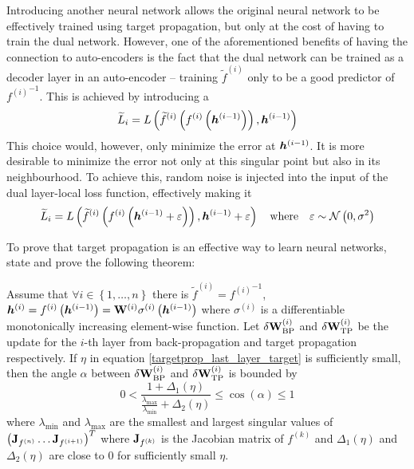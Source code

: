 Introducing another neural network allows the original neural network to be effectively trained using target propagation, but only at the cost of having to train the dual network. However, one of the aforementioned benefits of having the connection to auto-encoders is the fact that the dual network can be trained as a decoder layer in an auto-encoder -- training \( \widetilde{f}^{(i)} \) only to be a good predictor of \( {f^{(i)}}^{-1} \). This is achieved by introducing a 
\[ \widetilde{L}_i = L \left( \widetilde{f}^{(i)} \left( f^{(i)} \left( \bm{h}^{(i - 1)} \right) \right), \bm{h}^{(i - 1)} \right) \]
This choice would, however, only minimize the error at \( \bm{h}^{(i - 1)} \). It is more desirable to minimize the error not only at this singular point but also in its neighbourhood. To achieve this, random noise is injected into the input of the dual layer-local loss function, effectively making it
\[ \widetilde{L}_i = L \left( \widetilde{f}^{(i)} \left( f^{(i)} \left( \bm{h}^{(i - 1)} + \varepsilon \right) \right), \bm{h}^{(i - 1)} + \varepsilon \right) \quad \text{where} \quad \varepsilon \sim \mathcal{N} \left( 0, \sigma^2 \right) \]

To prove that target propagation is an effective way to learn neural networks, \cite{lee_difference_2015} state and prove the following theorem:

\begin{theorem}\label{targetprop_works}
	Assume that \( \forall i \in \left\{ 1, \dots, n \right\} \) there is \( \widetilde{f}^{(i)} = {f^{(i)}}^{-1} \), \( \bm{h}^{(i)} = f^{(i)} \left( \bm{h}^{(i - 1)} \right) = \mathbf{W}^{(i)} \sigma^{(i)} \left( \bm{h}^{(i - 1)} \right) \) where \( \sigma^{(i)} \) is a differentiable monotonically increasing element-wise function. Let \( \delta \mathbf{W}^{(i)}_{\mathrm{BP}} \) and \( \delta \mathbf{W}^{(i)}_{\mathrm{TP}} \) be the update for the \( i \)-th layer from back-propagation and target propagation respectively. If \( \eta \) in equation \ref{targetprop_last_layer_target} is sufficiently small, then the angle \( \alpha \) between \( \delta \mathbf{W}^{(i)}_{\mathrm{BP}} \) and \( \delta \mathbf{W}^{(i)}_{\mathrm{TP}} \) is bounded by
	\[ 0 < \frac{1 + \Delta_1 \left( \eta \right)}{\frac{\lambda_{\mathrm{max}}}{\lambda_{\mathrm{min}}} + \Delta_2 \left( \eta \right)} \leq \cos \left( \alpha \right) \leq 1 \]
		where \( \lambda_{\mathrm{min}} \) and \( \lambda_{\mathrm{max}} \) are the smallest and largest singular values of \( \left( \mathbf{J}_{f^{(n)}} \dots \mathbf{J}_{f^{(i + 1)}} \right)^T \) where \( \mathbf{J}_{f^{(k)}} \) is the Jacobian matrix of \( f^{(k)} \) and \( \Delta_1 \left( \eta \right) \) and \( \Delta_2 \left( \eta \right) \) are close to \( 0 \) for sufficiently small \( \eta \).
\end{theorem}

